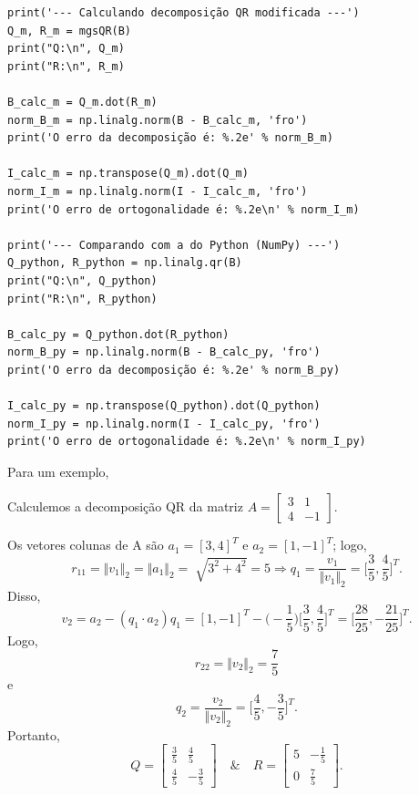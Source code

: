 \documentclass[../numerical_methods.tex]{subfiles}
\begin{document}
\begin{listing}[H]
	\begin{verbatim}
print('--- Calculando decomposição QR modificada ---')
Q_m, R_m = mgsQR(B)
print("Q:\n", Q_m)
print("R:\n", R_m)

B_calc_m = Q_m.dot(R_m)
norm_B_m = np.linalg.norm(B - B_calc_m, 'fro')
print('O erro da decomposição é: %.2e' % norm_B_m)

I_calc_m = np.transpose(Q_m).dot(Q_m)
norm_I_m = np.linalg.norm(I - I_calc_m, 'fro')
print('O erro de ortogonalidade é: %.2e\n' % norm_I_m)

print('--- Comparando com a do Python (NumPy) ---')
Q_python, R_python = np.linalg.qr(B)
print("Q:\n", Q_python)
print("R:\n", R_python)

B_calc_py = Q_python.dot(R_python)
norm_B_py = np.linalg.norm(B - B_calc_py, 'fro')
print('O erro da decomposição é: %.2e' % norm_B_py)

I_calc_py = np.transpose(Q_python).dot(Q_python)
norm_I_py = np.linalg.norm(I - I_calc_py, 'fro')
print('O erro de ortogonalidade é: %.2e\n' % norm_I_py)
\end{verbatim}
\end{listing}

Para um exemplo,
\begin{example}
	Calculemos a decomposição QR da matriz \(A = \begin{bmatrix}
		3 & 1  \\
		4 & -1
	\end{bmatrix}.\)

	Os vetores colunas de A são \(a_1 = [3, 4]^{T}\) e \(a_2 = [1, -1]^{T}\); logo,
	\[
		r_{11} = \Vert v_1 \Vert_{2} = \Vert a_{1} \Vert_{2} = \sqrt[]{3^{2}+4^{2}}=5 \Rightarrow q_1 = \frac{v_1}{\Vert v_1 \Vert_{2}} = \biggl[\frac{3}{5}, \frac{4}{5}\biggr]^{T}.
	\]
	Disso,
	\[
		v_{2} = a_{2} - (q_1 \cdot a_2)q_1 = [1, -1]^{T}-\biggl(-\frac{1}{5}\biggr)\biggl[\frac{3}{5}, \frac{4}{5}\biggr]^{T} = \biggl[\frac{28}{25}, -\frac{21}{25}\biggr]^{T}.
	\]
	Logo,
	\[
		r_{22} = \Vert v_2 \Vert_{2} = \frac{7}{5}
	\]
	e
	\[
		q_2 = \frac{v_2}{\Vert v_2 \Vert_2} = \biggl[\frac{4}{5}, -\frac{3}{5}\biggr]^{T}.
	\]
	Portanto,
	\[
		Q = \begin{bmatrix}
			\frac{3}{5} & \frac{4}{5}  \\
			\frac{4}{5} & -\frac{3}{5}
		\end{bmatrix} \quad\&\quad R = \begin{bmatrix}
			5 & -\frac{1}{5} \\
			0 & \frac{7}{5}
		\end{bmatrix}.
	\]
\end{example}
\end{document}
